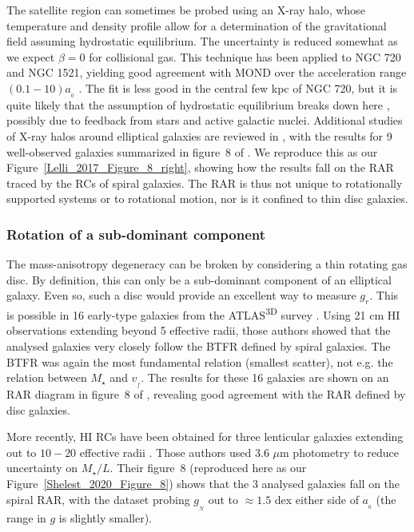 \documentclass[fleqn,usenatbib,useAMS,onecolumn]{mnras} %
\begin{document}
The satellite region can sometimes be probed using an X-ray halo, whose temperature and density profile allow for a determination of the gravitational field assuming hydrostatic equilibrium. The uncertainty is reduced somewhat as we expect $\beta = 0$ for collisional gas. This technique has been applied to NGC 720 and NGC 1521, yielding good agreement with MOND over the acceleration range $\left( 0.1 - 10 \right) a_{_0}$ \citep{Milgrom_2012}. The fit is less good in the central few kpc of NGC 720, but it is quite likely that the assumption of hydrostatic equilibrium breaks down here \citep{Diehl_2007}, possibly due to feedback from stars and active galactic nuclei. Additional studies of X-ray halos around elliptical galaxies are reviewed in \citet{Buote_2012}, with the results for 9 well-observed galaxies summarized in figure~8 of \citet{Lelli_2017}. We reproduce this as our Figure~\ref{Lelli_2017_Figure_8_right}, showing how the results fall on the RAR traced by the RCs of spiral galaxies. The RAR is thus not unique to rotationally supported systems or to rotational motion, nor is it confined to thin disc galaxies.


\subsubsection{Rotation of a sub-dominant component}
\label{Sub_dominant_rotating_component}

The mass-anisotropy degeneracy can be broken by considering a thin rotating gas disc. By definition, this can only be a sub-dominant component of an elliptical galaxy. Even so, such a disc would provide an excellent way to measure $g_r$. This is possible in 16 early-type galaxies from the ATLAS\textsuperscript{3D} survey \citep{Heijer_2015}. Using 21 cm HI observations extending beyond 5 effective radii, those authors showed that the analysed galaxies very closely follow the BTFR defined by spiral galaxies. The BTFR was again the most fundamental relation (smallest scatter), not e.g. the relation between $M_{\star}$ and $v_{_f}$. The results for these 16 galaxies are shown on an RAR diagram in figure~8 of \citet{Lelli_2017}, revealing good agreement with the RAR defined by disc galaxies.

More recently, HI RCs have been obtained for three lenticular galaxies extending out to $10-20$ effective radii \citep{Shelest_2020}. Those authors used 3.6 $\mu$m photometry to reduce uncertainty on $M_{\star}/L$. Their figure~8 (reproduced here as our Figure~\ref{Shelest_2020_Figure_8}) shows that the 3 analysed galaxies fall on the spiral RAR, with the dataset probing $g_{_N}$ out to $\approx 1.5$ dex either side of $a_{_0}$ (the range in $g$ is slightly smaller).
\end{document}
